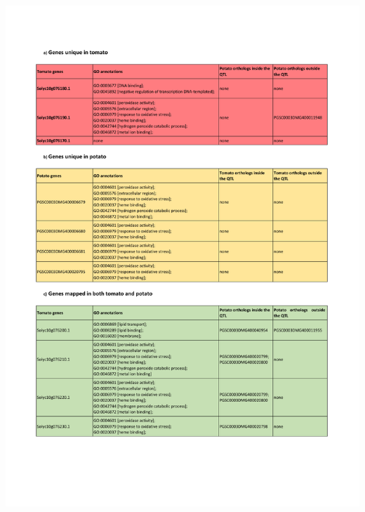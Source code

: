 \documentclass[applsci,article,accept,moreauthors,pdftex]{Definitions/mdpi}
\begin{document}
{\begin{table}[H]
\centering
\caption{\hl{Table comparing genes} %
 in QTLs associated with (tomato) fruit shape and (potato) tuber shape.
 Three classes represent (a) genes unique in tomato; (b) genes unique in potato (c) genes mapped in both species. %
 Each row contains a gene ID, GO annotations and orthologs inside/outside a QTL region. %
 The~query shows that only three genes are unique in tomato (i.e., \textit{Solyc10g076190.1}, \textit{Solyc10g076170.1} and \textit{Solyc10g076180.1}). %
}
\includegraphics[scale=.88]{Table1.pdf}
\label{chap4:T1}
\end{table}

}
\end{document}
